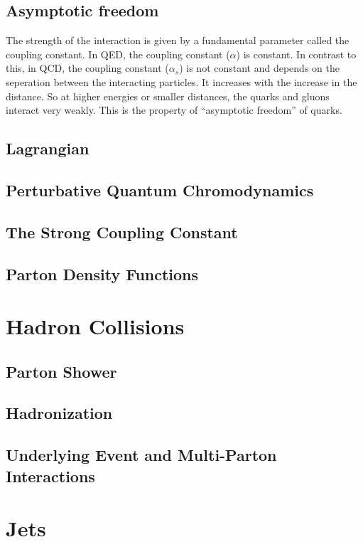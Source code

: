 \subsection{Asymptotic freedom}
The strength of the interaction is given by a fundamental parameter called the coupling constant. In QED, the coupling constant ($\alpha$) is constant. In contrast to this, in QCD, the coupling constant ($\alpha_s$) is not constant and depends on the seperation between the interacting particles. It increases with the increase in the distance. So at higher energies or smaller distances, the quarks and gluons interact very weakly. This is the property of ``asymptotic freedom'' of quarks.    

\subsection{Lagrangian}



\subsection{Perturbative Quantum Chromodynamics}
\subsection{The Strong Coupling Constant}
\subsection{Parton Density Functions}

\section{Hadron Collisions}
\subsection{Parton Shower}
\subsection{Hadronization}
\subsection{Underlying Event and Multi-Parton Interactions}

\section{Jets}
\label{sec:jets}
